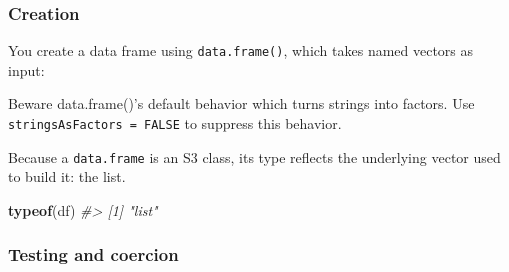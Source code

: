 \documentclass[]{book}
\newenvironment{Shaded}{\begin{snugshade}}{\end{snugshade}}
\newcommand{\KeywordTok}[1]{\textcolor[rgb]{0.13,0.29,0.53}{\textbf{#1}}}
\newcommand{\DataTypeTok}[1]{\textcolor[rgb]{0.13,0.29,0.53}{#1}}
\newcommand{\DecValTok}[1]{\textcolor[rgb]{0.00,0.00,0.81}{#1}}
\newcommand{\StringTok}[1]{\textcolor[rgb]{0.31,0.60,0.02}{#1}}
\newcommand{\CommentTok}[1]{\textcolor[rgb]{0.56,0.35,0.01}{\textit{#1}}}
\newcommand{\OtherTok}[1]{\textcolor[rgb]{0.56,0.35,0.01}{#1}}
\newcommand{\OperatorTok}[1]{\textcolor[rgb]{0.81,0.36,0.00}{\textbf{#1}}}
\newcommand{\NormalTok}[1]{#1}
\theoremstyle{definition}
\theoremstyle{definition}
\theoremstyle{definition}
\theoremstyle{remark}
\let\BeginKnitrBlock\begin \let\EndKnitrBlock\end
\begin{document}
\subsubsection{Creation}\label{creation}

You create a data frame using \texttt{data.frame()}, which takes named
vectors as input:

\begin{Shaded}
\end{Shaded}

\BeginKnitrBlock{rmdwarning}
Beware data.frame()'s default behavior which turns strings into factors.
Use \texttt{stringsAsFactors\ =\ FALSE} to suppress this behavior.
\EndKnitrBlock{rmdwarning}

\begin{Shaded}
\end{Shaded}

Because a \texttt{data.frame} is an S3 class, its type reflects the
underlying vector used to build it: the list.

\begin{Shaded}
\begin{Highlighting}[]
\KeywordTok{typeof}\NormalTok{(df)}
\CommentTok{#> [1] "list"}
\end{Highlighting}
\end{Shaded}

\subsubsection{Testing and coercion}\label{testing-and-coercion}
\end{document}
